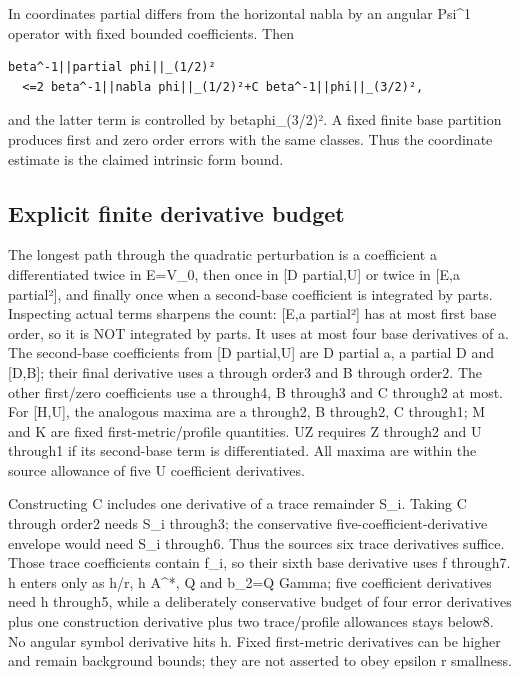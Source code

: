 \documentclass[11pt]{article}
\theoremstyle{definition}
\theoremstyle{remark}
\numberwithin{equation}{section}
\begin{document}
In coordinates partial differs from the horizontal nabla by an angular
Psi\^{}1 operator with fixed bounded coefficients. Then

\begin{verbatim}
beta^-1||partial phi||_(1/2)²
  <=2 beta^-1||nabla phi||_(1/2)²+C beta^-1||phi||_(3/2)²,
\end{verbatim}

and the latter term is controlled by
beta\textbar\textbar phi\textbar\textbar\_(3/2)². A fixed finite base
partition produces first and zero order errors with the same classes.
Thus the coordinate estimate is the claimed intrinsic form bound.

\hypertarget{source-71285ede3265-explicit-finite-derivative-budget}{%
\subsection{Explicit finite derivative
budget}\label{source-71285ede3265-explicit-finite-derivative-budget}}

The longest path through the quadratic perturbation is a coefficient a
differentiated twice in E=V\_0, then once in {[}D partial,U{]} or twice
in {[}E,a partial²{]}, and finally once when a second-base coefficient
is integrated by parts. Inspecting actual terms sharpens the count:
{[}E,a partial²{]} has at most first base order, so it is NOT integrated
by parts. It uses at most four base derivatives of a. The second-base
coefficients from {[}D partial,U{]} are D partial a, a partial D and
{[}D,B{]}; their final derivative uses a through order3 and B through
order2. The other first/zero coefficients use a through4, B through3 and
C through2 at most. For {[}H,U{]}, the analogous maxima are a through2,
B through2, C through1; M and K are fixed first-metric/profile
quantities. UZ requires Z through2 and U through1 if its second-base
term is differentiated. All maxima are within the source allowance of
five U coefficient derivatives.

Constructing C includes one derivative of a trace remainder S\_i. Taking
C through order2 needs S\_i through3; the conservative
five-coefficient-derivative envelope would need S\_i through6. Thus the
source\textquotesingle s six trace derivatives suffice. Those trace
coefficients contain f\_i, so their sixth base derivative uses f
through7. h enters only as h/r, h A\^{}*, Q and b\_2=Q Gamma; five
coefficient derivatives need h through5, while a deliberately
conservative budget of four error derivatives plus one construction
derivative plus two trace/profile allowances stays below8. No angular
symbol derivative hits h. Fixed first-metric derivatives can be higher
and remain background bounds; they are not asserted to obey epsilon r
smallness.
\end{document}
